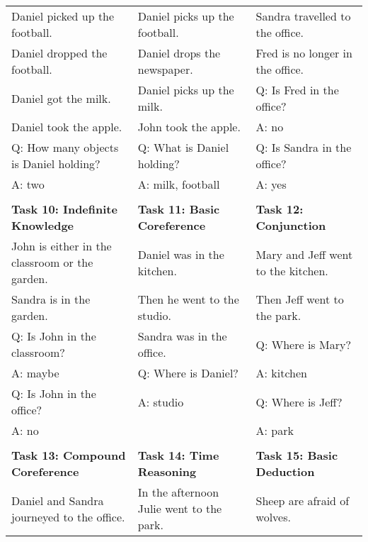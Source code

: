 \documentclass{article}
\begin{document}
\begin{table}
\begin{tabular}{@{}lll@{}}
\cmidrule(r){1-1} \cmidrule(lr){2-2} \cmidrule(lr){3-3}
Daniel picked up the football.         & Daniel picks up the football.    & Sandra travelled to the office. \\
Daniel dropped the football.           & Daniel drops the newspaper.      & Fred is no longer in the office.\\
Daniel got the milk.                   & Daniel picks up the milk.        & Q: Is Fred in the office?       \\
Daniel took the apple.                 & John took the apple.             & A: no                           \\
Q: How many objects is Daniel holding? & Q: What is Daniel holding?       & Q: Is Sandra in the office?     \\
A: two                                 & A: milk, football                & A: yes                          \\
&&\\
\textbf{Task 10: Indefinite Knowledge}  &
\textbf{Task 11: Basic Coreference}    &
\textbf{Task 12: Conjunction}    \\
\cmidrule(r){1-1} \cmidrule(lr){2-2} \cmidrule(lr){3-3}
John is either in the classroom or the garden. & Daniel was in the kitchen.  & Mary and Jeff went to the kitchen. \\
Sandra is in the garden.                           & Then he went to the studio. & Then Jeff went to the park.        \\
Q: Is John in the classroom?                       & Sandra was in the office.   & Q: Where is Mary?                  \\
A: maybe                                           & Q: Where is Daniel?         & A: kitchen                         \\
Q: Is John in the office?                          & A: studio                   & Q: Where is Jeff?                  \\
A: no                                              &                             & A: park                            \\
&&\\
\textbf{Task 13: Compound Coreference}  &
\textbf{Task 14: Time Reasoning}    &
\textbf{Task 15: Basic Deduction}    \\
\cmidrule(r){1-1} \cmidrule(lr){2-2} \cmidrule(lr){3-3}
Daniel and Sandra journeyed to the office. & In the afternoon Julie went to the park. & Sheep are afraid of wolves.    \\

\end{tabular}
\end{table}
\end{document}
